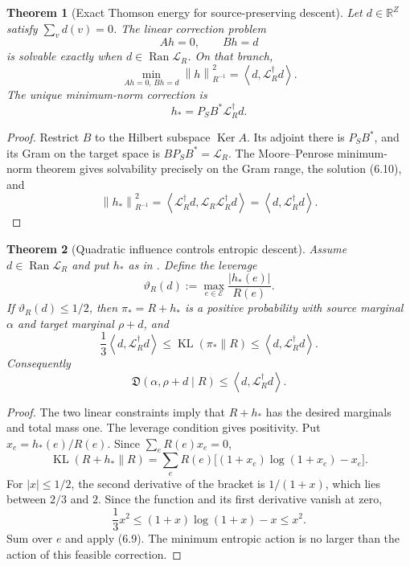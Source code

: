 \documentclass[11pt]{article}
\newtheorem{theorem}{Theorem}[section]
\theoremstyle{definition}
\theoremstyle{remark}
\newcommand{\R}{\mathbb R}
\newcommand{\Ker}{\operatorname{Ker}}
\newcommand{\Ran}{\operatorname{Ran}}
\newcommand{\KL}{\operatorname{KL}}
\newcommand{\norm}[1]{\left\lVert#1\right\rVert}
\newcommand{\ip}[2]{\left\langle#1,#2\right\rangle}
\begin{document}
\begin{theorem}[Exact Thomson energy for source-preserving descent]
\label{thm:Thomson-influence}
Let $d\in\R^Z$ satisfy $\sum_vd(v)=0$.  The linear correction problem
\[
 Ah=0,
 \qquad
 Bh=d
 \tag{6.8}
\]
is solvable exactly when $d\in\Ran\mathcal L_R$.  On that branch,
\[
 \boxed{
 \min_{Ah=0,\,Bh=d}\norm h_{R^{-1}}^2
 =\ip{d}{\mathcal L_R^\dagger d}.}
 \tag{6.9}
\]
The unique minimum-norm correction is
\[
 \boxed{
 h_*=P_SB^*\mathcal L_R^\dagger d.}
 \tag{6.10}
\]
\end{theorem}

\begin{proof}
Restrict $B$ to the Hilbert subspace $\Ker A$.  Its adjoint there is
$P_SB^*$, and its Gram on the target space is
$BP_SB^*=\mathcal L_R$.  The Moore--Penrose minimum-norm theorem gives
solvability precisely on the Gram range, the solution \textup{(6.10)}, and
\[
 \norm{h_*}_{R^{-1}}^2
 =\ip{\mathcal L_R^\dagger d}
        {\mathcal L_R\mathcal L_R^\dagger d}
 =\ip d{\mathcal L_R^\dagger d}.
\]
\end{proof}

\begin{theorem}[Quadratic influence controls entropic descent]
\label{thm:quadratic-to-entropy}
Assume $d\in\Ran\mathcal L_R$ and put $h_*$ as in
.  Define the leverage
\[
 \boxed{
 \vartheta_R(d)
 :=\max_{e\in\mathcal E}\frac{|h_*(e)|}{R(e)}.}
 \tag{6.11}
\]
If $\vartheta_R(d)\le1/2$, then $\pi_*=R+h_*$ is a positive probability with
source marginal $\alpha$ and target marginal $\rho+d$, and
\[
 \boxed{
 \frac13\ip d{\mathcal L_R^\dagger d}
 \le\KL(\pi_*\|R)
 \le\ip d{\mathcal L_R^\dagger d}.}
 \tag{6.12}
\]
Consequently
\[
 \boxed{
 \mathfrak D(\alpha,\rho+d\mid R)
 \le\ip d{\mathcal L_R^\dagger d}.}
 \tag{6.13}
\]
\end{theorem}

\begin{proof}
The two linear constraints imply that $R+h_*$ has the desired marginals and
total mass one.  The leverage condition gives positivity.  Put
$x_e=h_*(e)/R(e)$.  Since $\sum_eR(e)x_e=0$,
\[
 \KL(R+h_*\|R)
 =\sum_eR(e)\bigl[(1+x_e)\log(1+x_e)-x_e\bigr].
\]
For $|x|\le1/2$, the second derivative of the bracket is $1/(1+x)$, which
lies between $2/3$ and $2$.  Since the function and its first derivative
vanish at zero,
\[
 \frac13x^2
 \le(1+x)\log(1+x)-x
 \le x^2.
\]
Sum over $e$ and apply \textup{(6.9)}.  The minimum entropic action is no
larger than the action of this feasible correction.
\end{proof}
\end{document}
